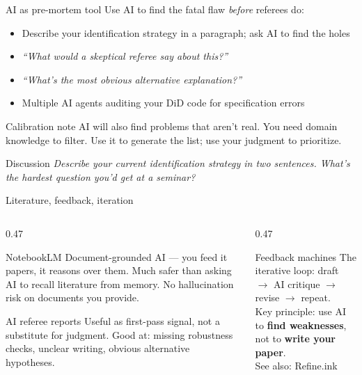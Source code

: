 \documentclass[aspectratio=169, 10pt]{beamer}
\newcommand{\discussprompt}[1]{%
  \begin{alertblock}{\faComments\quad Discussion}
    \textit{#1}
  \end{alertblock}
}
\begin{document}
\begin{frame}{AI as pre-mortem tool}
  Use AI to find the fatal flaw \textit{before} referees do:

  \vspace{0.5em}
  \begin{itemize}
    \setlength{\itemsep}{0.5em}
    \item Describe your identification strategy in a paragraph;
          ask AI to find the holes
    \item \textit{``What would a skeptical referee say about this?''}
    \item \textit{``What's the most obvious alternative explanation?''}
    \item Multiple AI agents auditing your DiD code for specification errors
  \end{itemize}

  \vspace{0.5em}
  \begin{alertblock}{Calibration note}
    AI will also find problems that aren't real.
    You need domain knowledge to filter.
    Use it to generate the list; use your judgment to prioritize.
  \end{alertblock}

  \discussprompt{Describe your current identification strategy in two sentences.
  What's the hardest question you'd get at a seminar?}
\end{frame}

\begin{frame}{Literature, feedback, iteration}
  \begin{columns}[T]
    \begin{column}{0.47\textwidth}
      \begin{block}{NotebookLM}
        \small Document-grounded AI --- you feed it papers, it reasons over
        them. Much safer than asking AI to recall literature from memory.
        No hallucination risk on documents you provide.
      \end{block}
      \vspace{0.4em}
      \begin{block}{AI referee reports}
        \small Useful as first-pass signal, not a substitute for judgment.
        Good at: missing robustness checks, unclear writing, obvious
        alternative hypotheses.
      \end{block}
    \end{column}
    \begin{column}{0.47\textwidth}
      \begin{block}{Feedback machines}
        \small The iterative loop: draft $\to$ AI critique $\to$ revise
        $\to$ repeat.\\[0.3em]
        Key principle: use AI to \textbf{find weaknesses}, not to
        \textbf{write your paper}.\\[0.3em]
        See also: Refine.ink
      \end{block}
    \end{column}
  \end{columns}
\end{frame}
\end{document}
